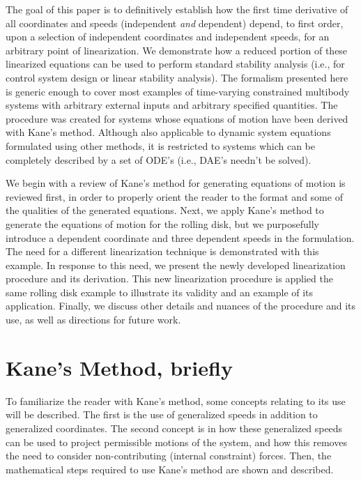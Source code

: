 \documentclass[smallcondensed,final]{svjour3}                     %
\begin{document}
The goal of this paper is to definitively establish how the first time
derivative of all coordinates and speeds (independent \textit{and} dependent)
depend, to first order, upon a selection of independent coordinates and
independent speeds, for an arbitrary point of linearization. We demonstrate how
a reduced portion of these linearized equations can be used to perform standard
stability analysis (i.e., for control system design or linear stability
analysis). The formalism presented here is generic enough to cover most
examples of time-varying constrained multibody systems with arbitrary external
inputs and arbitrary specified quantities.
The procedure was created for systems whose equations of motion have been
derived with Kane's method. Although also applicable to dynamic system
equations formulated using other methods, it is restricted to systems which can
be completely described by a set of ODE's (i.e., DAE's needn't be solved).

We begin with a review of Kane's method for generating equations of motion is
reviewed first, in order to properly orient the reader to the format and some
of the qualities of the generated equations. Next, we apply Kane's method to
generate the equations of motion for the rolling disk, but we purposefully
introduce a dependent coordinate and three dependent speeds in the formulation.
The need for a different linearization technique is demonstrated with this
example. In response to this need, we present the newly developed linearization
procedure and its derivation. This new linearization procedure is applied the
same rolling disk example to illustrate its validity and an example of its
application. Finally, we discuss other details and nuances of the procedure and
its use, as well as directions for future work.

\section{Kane's Method, briefly}
\label{sec:kane_method}
To familiarize the reader with Kane's method, some concepts relating to its use
will be described.  The first is the use of generalized speeds in addition to
generalized coordinates.  The second concept is in how these generalized speeds
can be used to project permissible motions of the system, and how this removes
the need to consider non-contributing (internal constraint) forces.  Then, the
mathematical steps required to use Kane's method are shown and described.
\end{document}
